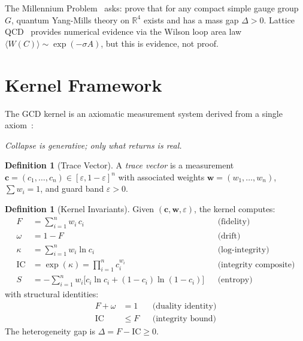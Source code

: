 \documentclass[11pt,a4paper]{article}
\theoremstyle{plain}
\theoremstyle{definition}
\newtheorem{definition}[theorem]{Definition}
\theoremstyle{remark}
\newcommand{\eps}{\varepsilon}
\newcommand{\tvec}{\mathbf{c}}
\newcommand{\wvec}{\mathbf{w}}
\newcommand{\IC}{\mathrm{IC}}
\begin{document}
The Millennium Problem~\cite{jaffe2006quantum} asks: prove that
for any compact simple gauge group $G$, quantum Yang-Mills theory
on $\mathbb{R}^4$ exists and has a mass gap $\Delta > 0$.
Lattice QCD~\cite{wilson1974confinement} provides numerical
evidence via the Wilson loop area law $\langle W(C) \rangle
\sim \exp(-\sigma A)$, but this is evidence, not proof.


\section{Kernel Framework}\label{sec:kernel}

The GCD kernel is an axiomatic measurement system derived from
a single axiom~\cite{paulus2025umcp,paulus2025episteme}:

\begin{axiombox}
\textit{Collapse is generative; only what returns is real.}
\end{axiombox}

\begin{definition}[Trace Vector]\label{def:trace}
A \emph{trace vector} is a measurement
$\tvec = (c_1, \ldots, c_n) \in [\eps, 1-\eps]^n$ with
associated weights $\wvec = (w_1, \ldots, w_n)$,
$\sum w_i = 1$, and guard band $\eps > 0$.
\end{definition}

\begin{definition}[Kernel Invariants]\label{def:invariants}
Given $(\tvec, \wvec, \eps)$, the kernel computes:
\begin{align}
  F   &= \sum_{i=1}^n w_i\, c_i
    && \text{(fidelity)} \label{eq:F} \\
  \omega &= 1 - F
    && \text{(drift)} \label{eq:omega} \\
  \kappa &= \sum_{i=1}^n w_i \ln c_i
    && \text{(log-integrity)} \label{eq:kappa} \\
  \IC &= \exp(\kappa) = \prod_{i=1}^n c_i^{w_i}
    && \text{(integrity composite)} \label{eq:IC} \\
  S &= -\!\sum_{i=1}^n w_i\bigl[c_i \ln c_i
    + (1{-}c_i)\ln(1{-}c_i)\bigr]
    && \text{(entropy)} \label{eq:S}
\end{align}
with structural identities:
\begin{align}
  F + \omega &= 1 && \text{(duality identity)} \label{eq:duality} \\
  \IC &\leq F && \text{(integrity bound)} \label{eq:bound}
\end{align}
The heterogeneity gap is $\Delta = F - \IC \geq 0$.
\end{definition}
\end{document}
